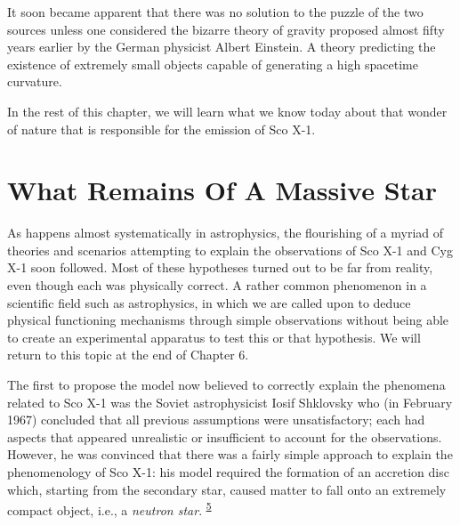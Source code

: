 It soon became apparent that there was no solution to the puzzle of the two sources
unless one considered the bizarre theory of gravity proposed almost fifty years earlier
by the German physicist Albert Einstein. A theory predicting the existence of extremely
small objects capable of generating a high spacetime curvature.

In the rest of this chapter, we will learn what we know today about that wonder of
nature that is responsible for the emission of Sco X-1.

\section{What Remains Of A Massive Star}\label{sec:05-remnant}

As happens almost systematically in astrophysics, the flourishing of a myriad of
theories and scenarios attempting to explain the observations of Sco
X-1 and Cyg X-1 soon followed. Most of these
hypotheses turned out to be far from reality, even though each was physically correct. A
rather common phenomenon in a scientific field such as astrophysics, in which we are
called upon to deduce physical functioning mechanisms through simple observations
without being able to create an experimental apparatus to test this or that hypothesis.
We will return to this topic at the end of Chapter 6.

The first to propose the model now believed to correctly explain the phenomena related
to Sco X-1 was the Soviet astrophysicist Iosif
Shklovsky who (in February 1967) concluded that all previous
assumptions were unsatisfactory; each had aspects that appeared unrealistic or
insufficient to account for the observations. However, he was convinced that there was a
fairly simple approach to explain the phenomenology of Sco X-1: his
model required the formation of an accretion disc which, starting
from the secondary star, caused matter to fall onto an extremely compact object, i.e., a
\emph{neutron star}. \textsuperscript{\hyperlink{note:05-05}{5}}


